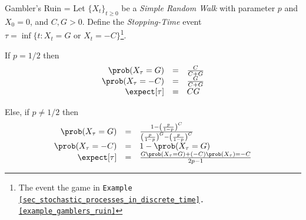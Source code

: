 \documentclass[11pt,a4paper]{article}
\begin{document}
    \begin{proposition}{Gambler's Ruin}\label{prop_gamblers_ruin}
      \everymath={\displaystyle}
      Let $\{X_t\}_{t\geq0}$ be a \textit{Simple Random Walk} with parameter $p$ and $X_0=0$, and $C,G>0$. Define the \textit{Stopping-Time} event $\tau=\inf\{t:X_t=G\text{ or }X_t=-C\}$\footnote{The event the game in \texttt{Example \ref{sec_stochastic_processes_in_discrete_time}.\ref{example_gamblers_ruin}}}.
      \par If $p=1/2$ then
      \[\begin{array}{rcl}
        \prob(X_\tau=G)&=&\frac{C}{C+G}\\
        \prob(X_\tau=-C)&=&\frac{G}{C+G}\\
        \expect[\tau]&=&CG
      \end{array}\]
      \par Else, if $p\neq1/2$ then
      \[\begin{array}{rcl}
        \prob(X_\tau=G)&=&\frac{1-\left(\frac{p}{1-p}\right)^C}{\left(\frac{p}{1-p}\right)^G-\left(\frac{p}{1-p}\right)^C}\\
        \prob(X_\tau=-C)&=&1-\prob(X_\tau=G)\\
        \expect[\tau]&=&\frac{G\prob(X_\tau=G)+(-C)\prob(X_\tau)=-C}{2p-1}
      \end{array}\]
    \end{proposition}
\end{document}
